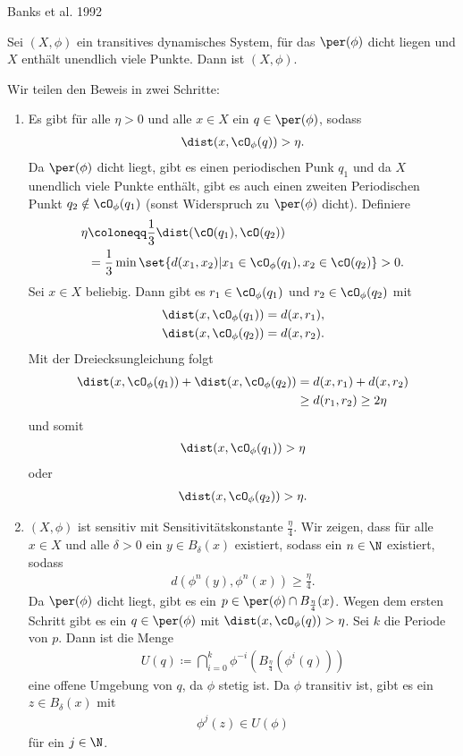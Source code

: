 \begin{satz}Banks et al. 1992

Sei $(X, \phi)$ ein transitives dynamisches System, für das $\per(\phi)$ dicht liegen und $X$ enthält unendlich viele Punkte. Dann ist $(X, \phi)$.
\end{satz}
\begin{beweis}
  Wir teilen den Beweis in zwei Schritte: 
  \begin{enumerate}
  \item Es gibt für alle $\eta > 0$ und alle $x \in X$ ein $q \in \per(\phi)$, sodass
    \begin{align*}
      \dist(x, \cO_\phi(q))> \eta.
    \end{align*}
Da $\per(\phi)$ dicht liegt, gibt es einen periodischen Punk $q_1$ und da $X$ unendlich viele Punkte enthält, gibt es auch einen zweiten Periodischen Punkt $q_2 \notin\cO_\phi(q_1)$ (sonst Widerspruch zu $\per(\phi)$ dicht). Definiere 
\begin{align*}
  \eta &\coloneqq \frac 1 3 \dist(\cO(q_1), \cO(q_2))\\
&= \frac 13 \min \set{d(x_1, x_2)| x_1 \in \cO_\phi(q_1), x_2 \in \cO(q_2)}>0.
\end{align*}
Sei $x \in X$ beliebig. Dann gibt es $r_1 \in \cO_\phi(q_1)$ und $r_2 \in \cO_\phi(q_2)$ mit 
\begin{align*}
  \dist(x, \cO_\phi(q_1)) = d(x, r_1),\\
  \dist(x, \cO_\phi(q_2)) = d(x, r_2).
\end{align*}
Mit der Dreiecksungleichung folgt
\begin{align*}
  \dist(x, \cO_\phi(q_1)) +   \dist(x, \cO_\phi(q_2)) &= d(x, r_1) + d(x, r_2)\\
&\geq d(r_1, r_2) \geq 2 \eta
\end{align*}
und somit
\begin{align*}
  \dist(x, \cO_\phi(q_1))> \eta
\end{align*}
oder 
\begin{align*}
  \dist(x, \cO_\phi(q_2))> \eta.
\end{align*}
\item $(X, \phi)$ ist sensitiv mit Sensitivitätskonstante $\frac \eta 4$. Wir zeigen, dass für alle $x \in X$ und alle $\delta > 0$ ein $y \in B_\delta(x)$ existiert, sodass ein $n \in \N$ existiert, sodass
  \begin{align*}
    d(\phi^n(y), \phi^n(x)) \geq \frac \eta 4. 
  \end{align*}
Da $\per(\phi)$ dicht liegt, gibt es ein $p \in \per(\phi) \cap B_{\frac \eta 4}(x)$. Wegen dem ersten Schritt gibt es ein $q \in \per(\phi)$ mit $\dist (x, \cO_\phi(q)) > \eta$. Sei $k$ die Periode von $p$. Dann ist die Menge 
\begin{align*}
  U(q) \coloneqq \bigcap_{i = 0}^k \phi^{-i}(B_{\frac \eta 4}(\phi^i(q)))
\end{align*}
eine offene Umgebung von $q$, da $\phi$ stetig ist. Da $\phi$ transitiv ist, gibt es ein $z \in B_\delta(x)$ mit 
\begin{align*}
  \phi^j(z)\in U(\phi)
\end{align*}
für ein $j \in \N$.


\end{enumerate}
\end{beweis}
